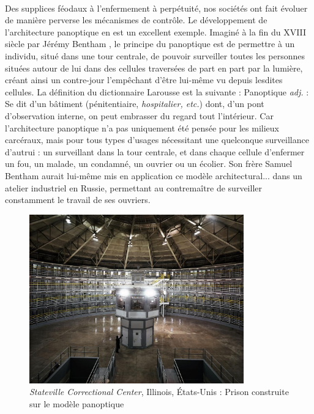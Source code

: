 \paragraph{} Des supplices féodaux à l'enfermement à perpétuité, nos sociétés ont fait évoluer de manière perverse les
mécanismes de contrôle. Le développement de l'architecture panoptique en est un excellent exemple. Imaginé à la fin du
XVIII siècle par Jérémy Bentham \cite{Panoptique1}, le principe du panoptique est de permettre à un individu,
situé dans une tour centrale, de pouvoir surveiller toutes les personnes situées autour de lui dans des cellules traversées
de part en part par la lumière, créant ainsi un contre-jour l'empêchant d'être lui-même vu depuis lesdites cellules.
La définition du dictionnaire Larousse est la suivante : \guillemotleft Panoptique \emph{adj.} : Se dit d'un bâtiment (pénitentiaire,
\emph{hospitalier, etc.}) dont, d'un pont d'observation interne, on peut embrasser du regard tout l'intérieur. \guillemotright
\cite{Panoptique0} Car l'architecture panoptique n'a pas uniquement été pensée pour les milieux carcéraux, mais pour tous
types d'usages nécessitant une quelconque surveillance d'autrui : \guillemotleft [...] un surveillant dans la
tour centrale, et dans chaque cellule d'enfermer un fou, un malade, un condamné, un ouvrier ou un écolier. \guillemotright
\cite{Panoptique2} Son frère Samuel Bentham aurait lui-même mis en application ce modèle architectural... dans un atelier
industriel en Russie, permettant au contremaître de surveiller constamment le travail de ses ouvriers.

\begin{figure}[h]
    \centering
    \includegraphics[width=350px]{chapters/01/images/panoptique.jpg}
    \caption{\label{Panoptique} \emph{Stateville Correctional Center}, Illinois, États-Unis : Prison construite sur le modèle panoptique}
\end{figure}

